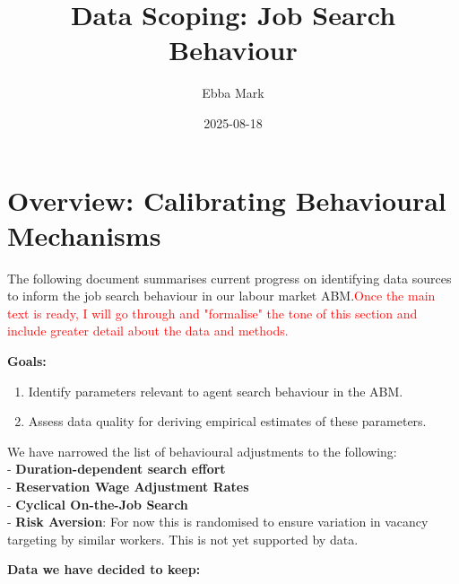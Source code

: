 \documentclass[
]{article}
\title{Data Scoping: Job Search Behaviour}
\author{Ebba Mark}
\date{2025-08-18}
\begin{document}
\maketitle

\section{Overview: Calibrating Behavioural
Mechanisms}\label{overview-calibrating-behavioural-mechanisms}

The following document summarises current progress on identifying data
sources to inform the job search behaviour in our labour market
ABM.\textcolor{red}{Once the main text is ready, I will go through and "formalise" the tone of this section and include greater detail about the data and methods.}

\textbf{Goals:}

\begin{enumerate}
\def\labelenumi{\arabic{enumi}.}
\item
  Identify parameters relevant to agent search behaviour in the ABM.
\item
  Assess data quality for deriving empirical estimates of these
  parameters.
\end{enumerate}

We have narrowed the list of behavioural adjustments to the following:\\
- \textbf{Duration-dependent search effort}\\
- \textbf{Reservation Wage Adjustment Rates}\\
- \textbf{Cyclical On-the-Job Search}\\
- \textbf{Risk Aversion}: For now this is randomised to ensure variation
in vacancy targeting by similar workers. This is not yet supported by
data.

\textbf{Data we have decided to keep:}
\end{document}
